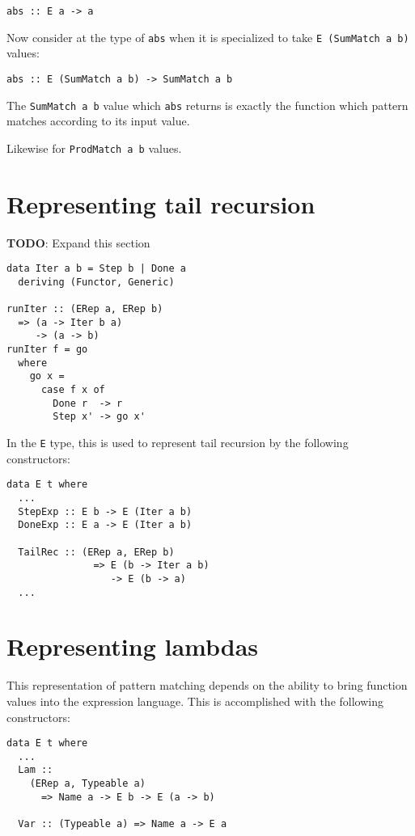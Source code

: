 \documentclass[sigplan,screen]{acmart}
\newcommand{\ttt}{\texttt}
\begin{document}
\begin{lstlisting}
abs :: E a -> a
\end{lstlisting}

Now consider at the type of \ttt{abs} when it is specialized to take
\ttt{E (SumMatch a b)} values:

\begin{lstlisting}
abs :: E (SumMatch a b) -> SumMatch a b
\end{lstlisting}

The \ttt{SumMatch a b} value which \ttt{abs} returns is exactly the function
which pattern matches according to its input value.

Likewise for \ttt{ProdMatch a b} values.

\section{Representing tail recursion}
\begin{tcolorbox}
  \textbf{TODO}: Expand this section
\end{tcolorbox}

\begin{lstlisting}
data Iter a b = Step b | Done a
  deriving (Functor, Generic)

runIter :: (ERep a, ERep b)
  => (a -> Iter b a)
     -> (a -> b)
runIter f = go
  where
    go x =
      case f x of
        Done r  -> r
        Step x' -> go x'
\end{lstlisting}

In the \ttt{E} type, this is used to represent tail recursion by
the following constructors:

\begin{lstlisting}
data E t where
  ...
  StepExp :: E b -> E (Iter a b)
  DoneExp :: E a -> E (Iter a b)

  TailRec :: (ERep a, ERep b)
               => E (b -> Iter a b)
                  -> E (b -> a)
  ...
\end{lstlisting}

\section{Representing lambdas}
This representation of pattern matching depends on the ability to bring
function values into the expression language. This is accomplished
with the following constructors:

\begin{lstlisting}
data E t where
  ...
  Lam ::
    (ERep a, Typeable a)
      => Name a -> E b -> E (a -> b)

  Var :: (Typeable a) => Name a -> E a
\end{lstlisting}
\end{document}
